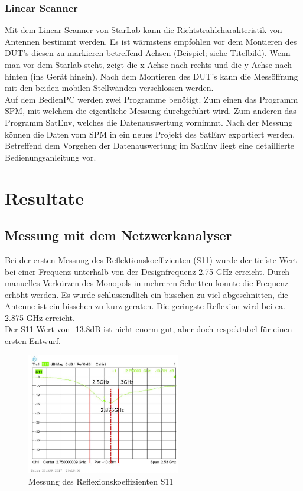 \subsubsection{Linear Scanner}
Mit dem Linear Scanner von StarLab kann die Richtstrahlcharakteristik von Antennen bestimmt werden. Es ist wärmstens empfohlen vor dem Montieren des DUT's diesen zu markieren betreffend Achsen (Beispiel; siehe Titelbild). Wenn man vor dem Starlab steht, zeigt die x-Achse nach rechts und die y-Achse nach hinten (ins Gerät hinein). Nach dem Montieren des DUT's kann die Messöffnung mit den beiden mobilen Stellwänden verschlossen werden.\\
Auf dem BedienPC werden zwei Programme benötigt. Zum einen das Programm SPM, mit welchem die eigentliche Messung durchgeführt wird. Zum anderen das Programm SatEnv, welches die Datenauswertung vornimmt. Nach der Messung können die Daten vom SPM in ein neues Projekt des SatEnv exportiert werden. Betreffend dem Vorgehen der Datenauswertung im SatEnv liegt eine detaillierte Bedienungsanleitung vor.


\newpage
\section{Resultate}


\subsection{Messung mit dem Netzwerkanalyser}
Bei der ersten Messung des Reflektionskoeffizienten (S11) wurde der tiefste Wert bei einer Frequenz unterhalb von der Designfrequenz 2.75 GHz erreicht. Durch manuelles Verkürzen des Monopols in mehreren Schritten konnte die Frequenz erhöht werden. Es wurde schlussendlich ein bisschen zu viel abgeschnitten, die Antenne ist ein bisschen zu kurz geraten. Die geringste Reflexion wird bei ca. 2.875 GHz erreicht.\\
Der S11-Wert von -13.8dB ist nicht enorm gut, aber doch respektabel für einen ersten Entwurf.

\begin{figure}[htbp]
	\centering
	\includegraphics[width=0.6\textwidth]{pic/Messungen/Messung_S11_bea.JPG}
	\caption{Messung des Reflexionskoeffizienten S11}
	\label{fig:MessungS11}
\end{figure}

